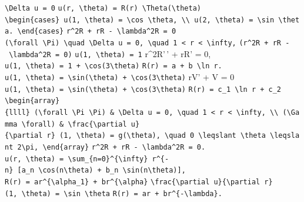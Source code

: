 \documentclass[
  ukrainian,
]{article}
\begin{document}
\texttt{\textbackslash{}Delta\ u\ =\ 0}
\texttt{u(r,\ \textbackslash{}theta)\ =\ R(r)\ \textbackslash{}Theta(\textbackslash{}theta)}
\texttt{\textbackslash{}begin\{cases\}\ u(1,\ \textbackslash{}theta)\ =\ \textbackslash{}cos\ \textbackslash{}theta,\ \textbackslash{}\textbackslash{}\ u(2,\ \textbackslash{}theta)\ =\ \textbackslash{}sin\ \textbackslash{}theta.\ \textbackslash{}end\{cases\}}
\texttt{r\^{}2R\textquotesingle{}\textquotesingle{}\ +\ rR\textquotesingle{}\ -\ \textbackslash{}lambda\^{}2R\ =\ 0}
\texttt{(\textbackslash{}forall\ \textbackslash{}Pi)\ \textbackslash{}quad\ \textbackslash{}Delta\ u\ =\ 0,\ \textbackslash{}quad\ 1\ \textless{}\ r\ \textless{}\ \textbackslash{}infty,}
\texttt{(r\^{}2R\textquotesingle{}\textquotesingle{}\ +\ rR\textquotesingle{}\ -\ \textbackslash{}lambda\^{}2R\ =\ 0)}
\texttt{u(1,\ \textbackslash{}theta)\ =\ 1} r\^{}2R'\,' + rR' = 0,
\texttt{u(1,\ \textbackslash{}theta)\ =\ 1\ +\ \textbackslash{}cos(3\textbackslash{}theta)}
\texttt{R(r)\ =\ a\ +\ b\ \textbackslash{}ln\ r.}
\texttt{u(1,\ \textbackslash{}theta)\ =\ \textbackslash{}sin(\textbackslash{}theta)\ +\ \textbackslash{}cos(3\textbackslash{}theta)}
rV' + V = 0
\texttt{u(1,\ \textbackslash{}theta)\ =\ \textbackslash{}sin(\textbackslash{}theta)\ +\ \textbackslash{}cos(3\textbackslash{}theta)}
\texttt{R(r)\ =\ c\_1\ \textbackslash{}ln\ r\ +\ c\_2}
\texttt{\textbackslash{}begin\{array\}\{llll\}\ (\textbackslash{}forall\ \textbackslash{}Pi\ \textbackslash{}Pi)\ \&\ \textbackslash{}Delta\ u\ =\ 0,\ \textbackslash{}quad\ 1\ \textless{}\ r\ \textless{}\ \textbackslash{}infty,\ \textbackslash{}\textbackslash{}\ (\textbackslash{}Gamma\ \textbackslash{}forall)\ \&\ \textbackslash{}frac\{\textbackslash{}partial\ u\}\{\textbackslash{}partial\ r\}\ (1,\ \textbackslash{}theta)\ =\ g(\textbackslash{}theta),\ \textbackslash{}quad\ 0\ \textbackslash{}leqslant\ \textbackslash{}theta\ \textbackslash{}leqslant\ 2\textbackslash{}pi,\ \textbackslash{}end\{array\}}
\texttt{r\^{}2R\textquotesingle{}\textquotesingle{}\ +\ rR\textquotesingle{}\ -\ \textbackslash{}lambda\^{}2R\ =\ 0.}
\texttt{u(r,\ \textbackslash{}theta)\ =\ \textbackslash{}sum\_\{n=0\}\^{}\{\textbackslash{}infty\}\ r\^{}\{-n\}\ {[}a\_n\ \textbackslash{}cos(n\textbackslash{}theta)\ +\ b\_n\ \textbackslash{}sin(n\textbackslash{}theta){]},}
\texttt{R(r)\ =\ ar\^{}\{\textbackslash{}alpha\_1\}\ +\ br\^{}\{\textbackslash{}alpha\}}
\texttt{\textbackslash{}frac\{\textbackslash{}partial\ u\}\{\textbackslash{}partial\ r\}(1,\ \textbackslash{}theta)\ =\ \textbackslash{}sin\ \textbackslash{}theta}
\texttt{R(r)\ =\ ar\textquotesingle{}\ +\ br\^{}\{-\textbackslash{}lambda\}.}
\end{document}

